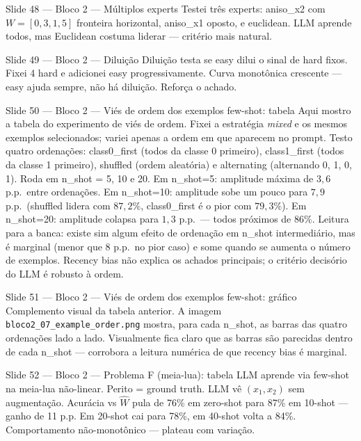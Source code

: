 \documentclass[aspectratio=169,10pt]{beamer}
\begin{document}
\begin{frame}{Slide 48 --- Bloco 2 --- M\'ultiplos experts}
\footnotesize
Testei tr\^es experts: aniso\_x2 com $W=[0{,}3, 1{,}5]$ fronteira horizontal, aniso\_x1 oposto, e euclidean. LLM aprende todos, mas Euclidean costuma liderar --- crit\'erio mais natural.
\end{frame}

\begin{frame}{Slide 49 --- Bloco 2 --- Dilui\c{c}\~ao}
\footnotesize
Dilui\c{c}\~ao testa se easy dilui o sinal de hard fixos. Fixei 4 hard e adicionei easy progressivamente. Curva monot\^onica crescente --- easy ajuda sempre, n\~ao h\'a dilui\c{c}\~ao. Refor\c{c}a o achado.
\end{frame}

\begin{frame}{Slide 50 --- Bloco 2 --- Vi\'es de ordem dos exemplos few-shot: tabela}
\footnotesize
Aqui mostro a tabela do experimento de vi\'es de ordem. Fixei a estrat\'egia \emph{mixed} e os mesmos exemplos selecionados; variei apenas a ordem em que aparecem no prompt. Testo quatro ordena\c{c}\~oes: class0\_first (todos da classe 0 primeiro), class1\_first (todos da classe 1 primeiro), shuffled (ordem aleat\'oria) e alternating (alternando 0, 1, 0, 1). Roda em n\_shot = 5, 10 e 20. Em n\_shot=5: amplitude m\'axima de $3{,}6$ p.p.\ entre ordena\c{c}\~oes. Em n\_shot=10: amplitude sobe um pouco para $7{,}9$ p.p.\ (shuffled lidera com $87{,}2\%$, class0\_first \'e o pior com $79{,}3\%$). Em n\_shot=20: amplitude colapsa para $1{,}3$ p.p.\ --- todos pr\'oximos de $86\%$. Leitura para a banca: existe sim algum efeito de ordena\c{c}\~ao em n\_shot intermedi\'ario, mas \'e marginal (menor que 8 p.p.\ no pior caso) e some quando se aumenta o n\'umero de exemplos. Recency bias n\~ao explica os achados principais; o crit\'erio decis\'orio do LLM \'e robusto \`a ordem.
\end{frame}

\begin{frame}{Slide 51 --- Bloco 2 --- Vi\'es de ordem dos exemplos few-shot: gr\'afico}
\footnotesize
Complemento visual da tabela anterior. A imagem \texttt{bloco2\_07\_example\_order.png} mostra, para cada n\_shot, as barras das quatro ordena\c{c}\~oes lado a lado. Visualmente fica claro que as barras s\~ao parecidas dentro de cada n\_shot --- corrobora a leitura num\'erica de que recency bias \'e marginal.
\end{frame}

\begin{frame}{Slide 52 --- Bloco 2 --- Problema F (meia-lua): tabela}
\footnotesize
LLM aprende via few-shot na meia-lua n\~ao-linear. Perito = ground truth. LLM v\^e $(x_1, x_2)$ sem augmenta\c{c}\~ao. Acur\'acia vs $\hat W$ pula de 76\% em zero-shot para 87\% em 10-shot --- ganho de 11 p.p. Em 20-shot cai para 78\%, em 40-shot volta a 84\%. Comportamento n\~ao-monot\^onico --- plateau com varia\c{c}\~ao.
\end{frame}
\end{document}
